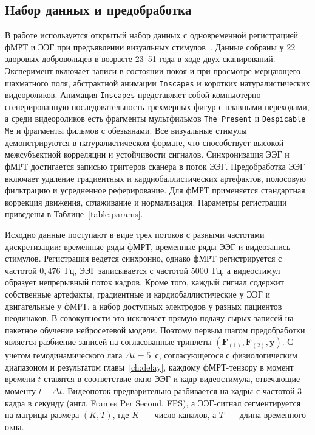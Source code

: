 \subsection{Набор данных и предобработка}\label{sec4:data}

В работе используется открытый набор данных с одновременной регистрацией фМРТ и ЭЭГ при предъявлении визуальных стимулов~\cite{Telesford2023}. Данные собраны у 22 здоровых добровольцев в возрасте 23--51 года в ходе двух сканирований. Эксперимент включает записи в состоянии покоя и при просмотре мерцающего шахматного поля, абстрактной анимации \texttt{Inscapes} и коротких натуралистических видеороликов. Анимация \texttt{Inscapes} представляет собой компьютерно сгенерированную последовательность трехмерных фигур с плавными переходами, а среди видеороликов есть фрагменты мультфильмов \texttt{The Present} и \texttt{Despicable Me} и фрагменты фильмов с обезьянами. Все визуальные стимулы демонстрируются в натуралистическом формате, что способствует высокой межсубъектной корреляции и устойчивости сигналов. Синхронизация ЭЭГ и фМРТ достигается записью триггеров сканера в поток ЭЭГ. Предобработка ЭЭГ включает удаление градиентных и кардиобаллистических артефактов, полосовую фильтрацию и усредненное реферирование. Для фМРТ применяется стандартная коррекция движения, сглаживание и нормализация. Параметры регистрации приведены в Таблице~\ref{table:params}.

Исходно данные поступают в виде трех потоков с разными частотами дискретизации: временные ряды фМРТ, временные ряды ЭЭГ и видеозапись стимулов. Регистрация ведется синхронно, однако фМРТ регистрируется с частотой $0{,}476$~Гц, ЭЭГ записывается с частотой $5000$~Гц, а видеостимул образует непрерывный поток кадров. Кроме того, каждый сигнал содержит собственные артефакты, градиентные и кардиобаллистические у ЭЭГ и двигательные у фМРТ, а набор доступных электродов у разных пациентов неодинаков. В совокупности это исключает прямую подачу сырых записей на пакетное обучение нейросетевой модели. Поэтому первым шагом предобработки является разбиение записей на согласованные триплеты $(\mathbf{F}_{(1)}, \mathbf{F}_{(2)}, \mathbf{y})$. С учетом гемодинамического лага $\Delta t = 5$~с, согласующегося с физиологическим диапазоном и результатом главы~\ref{ch:delay}, каждому фМРТ-тензору в момент времени $t$ ставятся в соответствие окно ЭЭГ и кадр видеостимула, отвечающие моменту $t - \Delta t$. Видеопоток предварительно разбивается на кадры с частотой 3 кадра в секунду (англ. Frames Per Second, FPS), а ЭЭГ-сигнал сегментируется на матрицы размера $(K, T)$, где $K$~--- число каналов, а $T$~--- длина временного окна.

